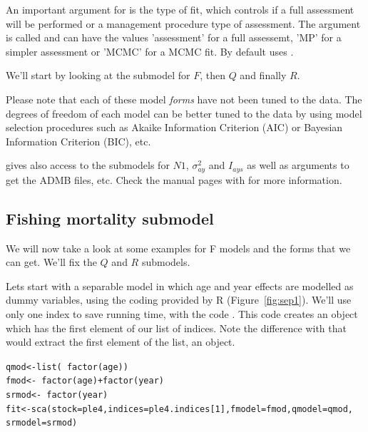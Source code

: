 \documentclass[a4paper,english,10pt]{article}\usepackage[]{graphicx}\usepackage[]{color}
\makeatletter
\newcommand{\hlnum}[1]{\textcolor[rgb]{0.063,0.58,0.627}{#1}}%
\newcommand{\hlopt}[1]{\textcolor[rgb]{0.196,0.196,0.196}{#1}}%
\newcommand{\hlstd}[1]{\textcolor[rgb]{0.196,0.196,0.196}{#1}}%
\newcommand{\hlkwb}[1]{\textcolor[rgb]{0.627,0,0.314}{#1}}%
\newcommand{\hlkwc}[1]{\textcolor[rgb]{0,0.631,0.314}{#1}}%
\newcommand{\hlkwd}[1]{\textcolor[rgb]{0.78,0.227,0.412}{#1}}%
\newenvironment{kframe}{%
 \def\at@end@of@kframe{}%
 \ifinner\ifhmode%
  \def\at@end@of@kframe{\end{minipage}}%
  \begin{minipage}{\columnwidth}%
 \fi\fi%
 \def\FrameCommand##1{\hskip\@totalleftmargin \hskip-\fboxsep
 \colorbox{shadecolor}{##1}\hskip-\fboxsep
     \hskip-\linewidth \hskip-\@totalleftmargin \hskip\columnwidth}%
 \MakeFramed {\advance\hsize-\width
   \@totalleftmargin\z@ \linewidth\hsize
   \@setminipage}}%
 {\par\unskip\endMakeFramed%
 \at@end@of@kframe}
\newenvironment{knitrout}{}{} %
\makeatother
\begin{document}
An important argument for  is the type of fit, which controls if a full assessment will be performed or a management procedure type of assessment. The argument is called  and can have the values 'assessment' for a full assessemt, 'MP' for a simpler assessment or 'MCMC' for a MCMC fit. By default  uses .

We'll start by looking at the submodel for $F$, then $Q$ and finally $R$.

Please note that each of these model \emph{forms} have not been tuned to the data. The degrees of freedom of each model can be better tuned to the data by using model selection procedures such as Akaike Information Criterion (AIC) or Bayesian Information Criterion (BIC), etc.

 gives also access to the submodels for $N1$, $\sigma^2_{ay}$ and $I_{ays}$ as well as arguments to get the ADMB files, etc. Check the manual pages with  for more information.

\subsection{Fishing mortality submodel}

We will now take a look at some examples for F models and the forms that we can get. We'll fix the $Q$ and $R$ submodels.

Lets start with a separable model in which age and year effects are modelled as dummy variables, using the  coding provided by R (Figure~\ref{fig:sep1}). We'll use only one index to save running time, with the code . This code creates an  object which has the first element of our list of indices. Note the difference with  that would extract the first element of the list, an  object.

\begin{knitrout}
\color{fgcolor}\begin{kframe}
\begin{alltt}
\hlstd{qmod} \hlkwb{<-} \hlkwd{list}\hlstd{(}\hlopt{~}\hlkwd{factor}\hlstd{(age))}
\hlstd{fmod} \hlkwb{<-} \hlopt{~}\hlkwd{factor}\hlstd{(age)} \hlopt{+} \hlkwd{factor}\hlstd{(year)}
\hlstd{srmod} \hlkwb{<-} \hlopt{~}\hlkwd{factor}\hlstd{(year)}
\hlstd{fit} \hlkwb{<-} \hlkwd{sca}\hlstd{(}\hlkwc{stock} \hlstd{= ple4,} \hlkwc{indices} \hlstd{= ple4.indices[}\hlnum{1}\hlstd{],} \hlkwc{fmodel} \hlstd{= fmod,} \hlkwc{qmodel} \hlstd{= qmod,}
    \hlkwc{srmodel} \hlstd{= srmod)}
\end{alltt}
\end{kframe}
\end{knitrout}
\end{document}
